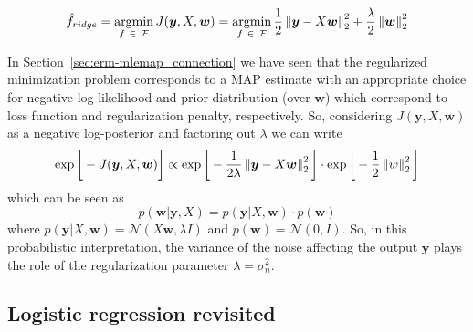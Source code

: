 \begin{equation} \label{eq:ridge_regression2}
	\hat f_{ridge} = \mathop{\mathrm{argmin}}\limits_{f~\in~\mathcal{F}} J(\bm{y}, X, \bm{w}) = \mathop{\mathrm{argmin}}\limits_{f~\in~\mathcal{F}}\frac{1}{2} \left\lVert\bm{y} - X\bm{w}\right\rVert_2^2+\frac{\lambda}{2}\left\lVert\bm{w}\right\rVert_2^2
\end{equation}

In Section~\ref{sec:erm-mlemap_connection} we have seen that the regularized minimization problem corresponds to a MAP estimate with an appropriate choice for negative log-likelihood and prior distribution (over $\bm{w}$) which correspond to loss function and regularization penalty, respectively. So, considering $J(\bm{y}, X, \bm{w})$ as a negative log-posterior and factoring out $\lambda$ we can write
$$
\exp{\bigg[-J(\bm{y}, X, \bm{w})\bigg]} \propto \exp \bigg[ -\frac{1}{2\lambda} \left\lVert\bm{y}-X\bm{w}\right\rVert_2^2 \bigg] \cdot \exp{\bigg[-\frac{1}{2}\left\lVert w\right\rVert_2^2 \bigg]}
$$
which can be seen as
$$
p(\bm{w}|\bm{y},X) = p(\bm{y}|X,\bm{w}) \cdot p(\bm{w})
$$
where $p(\bm{y}|X,\bm{w}) = \mathcal{N}(X\bm{w}, \lambda I)$ and $p(\bm{w}) = \mathcal{N}(0,I)$. So, in this probabilistic interpretation, the variance of the noise affecting the output $\bm{y}$ plays the role of the regularization parameter $\lambda = \sigma_n^2$.


%
%
%
%


\subsection{Logistic regression revisited} \label{subsec:logistic_regression_revisited}
